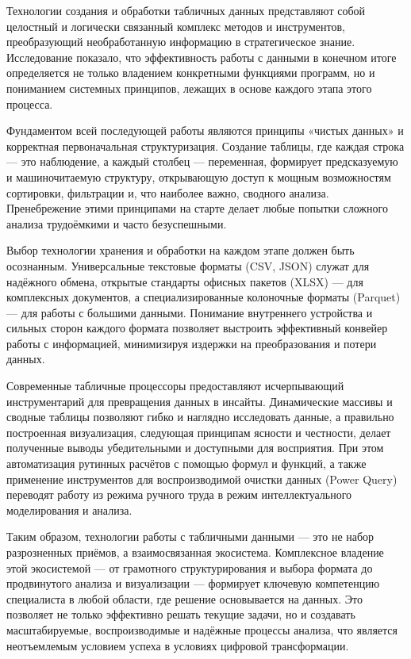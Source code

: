 \documentclass{SibFU-docs}
\begin{document}
Технологии создания и обработки табличных данных представляют собой целостный и логически связанный комплекс методов и инструментов, преобразующий необработанную информацию в стратегическое знание. Исследование показало, что эффективность работы с данными в конечном итоге определяется не только владением конкретными функциями программ, но и пониманием системных принципов, лежащих в основе каждого этапа этого процесса.

Фундаментом всей последующей работы являются принципы «чистых данных» и корректная первоначальная структуризация. Создание таблицы, где каждая строка — это наблюдение, а каждый столбец — переменная, формирует предсказуемую и машиночитаемую структуру, открывающую доступ к мощным возможностям сортировки, фильтрации и, что наиболее важно, сводного анализа. Пренебрежение этими принципами на старте делает любые попытки сложного анализа трудоёмкими и часто безуспешными.

Выбор технологии хранения и обработки на каждом этапе должен быть осознанным. Универсальные текстовые форматы (CSV, JSON) служат для надёжного обмена, открытые стандарты офисных пакетов (XLSX) — для комплексных документов, а специализированные колоночные форматы (Parquet) — для работы с большими данными. Понимание внутреннего устройства и сильных сторон каждого формата позволяет выстроить эффективный конвейер работы с информацией, минимизируя издержки на преобразования и потери данных.

Современные табличные процессоры предоставляют исчерпывающий инструментарий для превращения данных в инсайты. Динамические массивы и сводные таблицы позволяют гибко и наглядно исследовать данные, а правильно построенная визуализация, следующая принципам ясности и честности, делает полученные выводы убедительными и доступными для восприятия. При этом автоматизация рутинных расчётов с помощью формул и функций, а также применение инструментов для воспроизводимой очистки данных (Power Query) переводят работу из режима ручного труда в режим интеллектуального моделирования и анализа.

Таким образом, технологии работы с табличными данными — это не набор разрозненных приёмов, а взаимосвязанная экосистема. Комплексное владение этой экосистемой — от грамотного структурирования и выбора формата до продвинутого анализа и визуализации — формирует ключевую компетенцию специалиста в любой области, где решение основывается на данных. Это позволяет не только эффективно решать текущие задачи, но и создавать масштабируемые, воспроизводимые и надёжные процессы анализа, что является неотъемлемым условием успеха в условиях цифровой трансформации.
\end{document}
